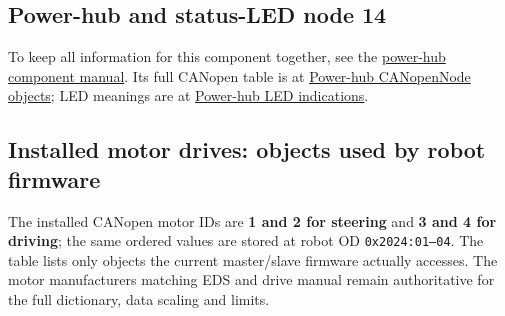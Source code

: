 \documentclass[
  10pt,
  letterpaper,
  openany]{report}
\begin{document}
\subsection{Power-hub and status-LED node
14}\label{power-hub-and-status-led-node-14}

To keep all information for this component together, see the
\hyperref[power-hub]{power-hub component manual}. Its full CANopen table
is at \hyperref[power-hub-objects]{Power-hub CANopenNode objects}; LED
meanings are at \hyperref[power-hub-led]{Power-hub LED indications}.

\subsection{Installed motor drives: objects used by robot
firmware}\label{installed-motor-drives-objects-used-by-robot-firmware}

The installed CANopen motor IDs are \textbf{1 and 2 for steering} and
\textbf{3 and 4 for driving}; the same ordered values are stored at
robot OD \texttt{0x2024:01–04}. The table lists only objects the current
master/slave firmware actually accesses. The motor
manufacturer\textquotesingle s matching EDS and drive manual remain
authoritative for the full dictionary, data scaling and limits.
\end{document}
